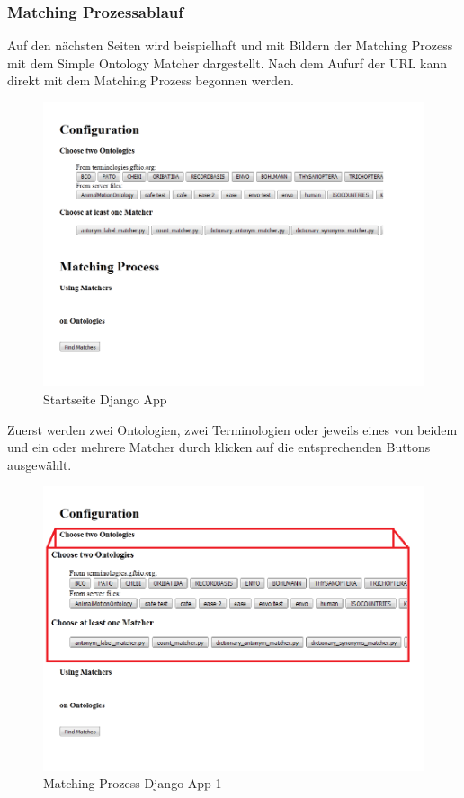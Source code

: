 		\subsubsection{Matching Prozessablauf}
		Auf den nächsten Seiten wird beispielhaft und mit Bildern der Matching Prozess
		mit dem Simple Ontology Matcher dargestellt.
		Nach dem Aufurf der URL kann direkt mit dem Matching Prozess begonnen werden.
		\begin{figure}[h!]
		\centering
		\includegraphics[width=1.0\textwidth]{pics/SimpleOntologyMatcher.png}
		\caption{Startseite Django App}
		\label{fig3}
		\end{figure}
		
		\pagebreak[4]
		Zuerst werden zwei Ontologien, zwei Terminologien oder jeweils eines von
		beidem und ein oder mehrere Matcher durch klicken auf die entsprechenden
		Buttons ausgewählt.
		\begin{figure}[h!]
		\centering
		\includegraphics[width=1.0\textwidth]{pics/SimpleOntologyMatcher-Process.png}
		\caption{Matching Prozess Django App 1}
		\label{fig4}
		\end{figure}
		
